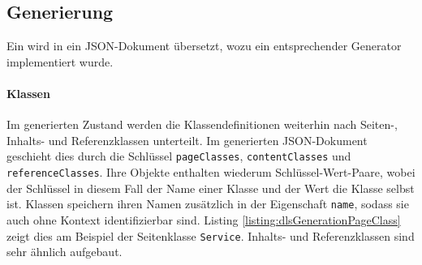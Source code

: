 \subsection{Generierung}
    \label{section:solutionDetailsDslGeneration}
    Ein {\classificationModel} wird in ein JSON-Dokument übersetzt,
    wozu ein entsprechender Generator implementiert wurde.

    \paragraph*{Klassen}
    Im generierten Zustand werden die Klassendefinitionen weiterhin nach
    Seiten-, Inhalts- und Referenzklassen unterteilt.
    Im generierten JSON-Dokument geschieht dies durch die Schlüssel \texttt{pageClasses},
    \texttt{contentClasses} und \texttt{referenceClasses}.
    Ihre Objekte enthalten wiederum Schlüssel-Wert-Paare,
    wobei der Schlüssel in diesem Fall der Name einer Klasse und der
    Wert die Klasse selbst ist.
    Klassen speichern ihren Namen zusätzlich in der Eigenschaft \texttt{name},
    sodass sie auch ohne Kontext identifizierbar sind.
    Listing \ref{listing:dlsGenerationPageClass} zeigt dies am Beispiel
    der Seitenklasse \texttt{Service}.
    Inhalts- und Referenzklassen sind sehr ähnlich aufgebaut.

    

